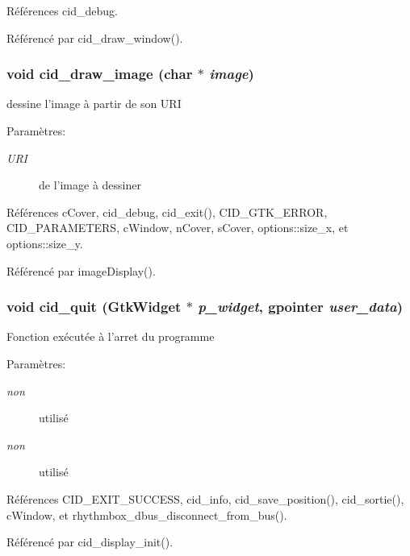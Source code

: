 Références cid\_\-debug.

Référencé par cid\_\-draw\_\-window().
\subsubsection{\setlength{\rightskip}{0pt plus 5cm}void cid\_\-draw\_\-image (char $\ast$ {\em image})}\label{cid-gtk_8h_e0482c3e4b140b468fe3e45acec0c99a}


dessine l'image à partir de son URI \begin{Desc}
\item[Paramètres:]
\begin{description}
\item[{\em URI}]de l'image à dessiner \end{description}
\end{Desc}


Références cCover, cid\_\-debug, cid\_\-exit(), CID\_\-GTK\_\-ERROR, CID\_\-PARAMETERS, cWindow, nCover, sCover, options::size\_\-x, et options::size\_\-y.

Référencé par imageDisplay().
\subsubsection{\setlength{\rightskip}{0pt plus 5cm}void cid\_\-quit (GtkWidget $\ast$ {\em p\_\-widget}, \/  gpointer {\em user\_\-data})}\label{cid-gtk_8h_b30f4a7e4964994d4755efee3a97dad6}


Fonction exécutée à l'arret du programme \begin{Desc}
\item[Paramètres:]
\begin{description}
\item[{\em non}]utilisé \item[{\em non}]utilisé \end{description}
\end{Desc}


Références CID\_\-EXIT\_\-SUCCESS, cid\_\-info, cid\_\-save\_\-position(), cid\_\-sortie(), cWindow, et rhythmbox\_\-dbus\_\-disconnect\_\-from\_\-bus().

Référencé par cid\_\-display\_\-init().